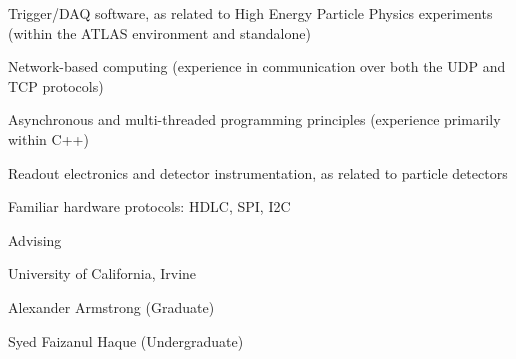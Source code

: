\vspace{0.1in}
\hspace{0.2in}
\begin{minipage}{0.8\textwidth}


    \vspace{0.1in}
    \hspace{0.15in}
    \begin{minipage}{\textwidth}
    Trigger/DAQ software, as related to High Energy Particle Physics experiments (within the ATLAS environment and standalone)
    \end{minipage}

    \vspace{0.1in}
    \hspace{0.15in}
    \begin{minipage}{\textwidth}
    Network-based computing (experience in communication over both the UDP and TCP protocols)
    \end{minipage}

    \vspace{0.1in}
    \hspace{0.15in}
    \begin{minipage}{\textwidth}
    Asynchronous and multi-threaded programming principles (experience primarily within C++)
    \end{minipage}

    \vspace{0.1in}
    \hspace{0.15in}
    \begin{minipage}{\textwidth}
    Readout electronics and detector instrumentation, as related to particle detectors
    \end{minipage}

    \vspace{0.1in}
    \hspace{0.15in}
    \begin{minipage}{\textwidth}
    Familiar hardware protocols: HDLC, SPI, I2C
    \end{minipage}



\end{minipage}

\vspace{0.35in}
{\Large Advising}\\
\HRule

\hspace{0.25in}
\begin{minipage}{0.8\textwidth}
	\vspace{0.15in}
	University of California, Irvine

	\hspace{0.15in}
	\begin{minipage}{1.0\textwidth}
		\vspace{0.1in}
		Alexander Armstrong (Graduate)

		\vspace{0.1in}
		Syed Faizanul Haque (Undergraduate)
	\end{minipage}
\end{minipage}

